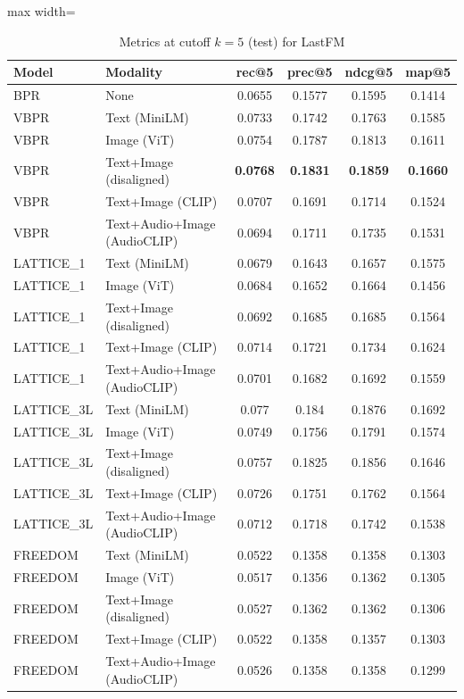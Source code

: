\begin{table}[H]
    \centering
    \begin{adjustbox}{max width=\textwidth}
    \begin{tabular}{|l|l|c|c|c|c|}
    \hline
    	\textbf{Model} & \textbf{Modality} & \textbf{rec@5} & \textbf{prec@5} & \textbf{ndcg@5} & \textbf{map@5} \\
    \hline
    BPR & None & 0.0655 & 0.1577 & 0.1595 & 0.1414 \\
    \hline
    VBPR & Text (MiniLM) & 0.0733 & 0.1742 & 0.1763 & 0.1585 \\
    \hline
    VBPR & Image (ViT) & 0.0754 & 0.1787 & 0.1813 & 0.1611 \\
    \hline
    VBPR & Text+Image (disaligned) & \textbf{0.0768} & \textbf{0.1831} & \textbf{0.1859} & \textbf{0.1660} \\
    \hline
    VBPR & Text+Image (CLIP) & 0.0707 & 0.1691 & 0.1714 & 0.1524 \\
    \hline
    VBPR & Text+Audio+Image (AudioCLIP) & 0.0694 & 0.1711 & 0.1735 & 0.1531 \\
    \hline
    LATTICE\_1 & Text (MiniLM) & 0.0679 & 0.1643 & 0.1657 & 0.1575 \\
    \hline
    LATTICE\_1 & Image (ViT) & 0.0684 & 0.1652 & 0.1664 & 0.1456 \\
    \hline
    LATTICE\_1 & Text+Image (disaligned) & 0.0692 & 0.1685 & 0.1685 & 0.1564 \\
    \hline
    LATTICE\_1 & Text+Image (CLIP) & 0.0714 & 0.1721 & 0.1734 & 0.1624 \\
    \hline
    LATTICE\_1 & Text+Audio+Image (AudioCLIP) & 0.0701 & 0.1682 & 0.1692 & 0.1559 \\
    \hline
    LATTICE\_3L & Text (MiniLM) & 0.077 & 0.184 & 0.1876 & 0.1692 \\
    \hline
    LATTICE\_3L & Image (ViT) & 0.0749 & 0.1756 & 0.1791 & 0.1574 \\
    \hline
    LATTICE\_3L & Text+Image (disaligned) & 0.0757 & 0.1825 & 0.1856 & 0.1646 \\
    \hline
    LATTICE\_3L & Text+Image (CLIP) & 0.0726 & 0.1751 & 0.1762 & 0.1564 \\
    \hline
    LATTICE\_3L & Text+Audio+Image (AudioCLIP) & 0.0712 & 0.1718 & 0.1742 & 0.1538 \\
    \hline
    FREEDOM & Text (MiniLM) & 0.0522 & 0.1358 & 0.1358 & 0.1303 \\
    \hline
    FREEDOM & Image (ViT) & 0.0517 & 0.1356 & 0.1362 & 0.1305 \\
    \hline
    FREEDOM & Text+Image (disaligned) & 0.0527 & 0.1362 & 0.1362 & 0.1306 \\
    \hline
    FREEDOM & Text+Image (CLIP) & 0.0522 & 0.1358 & 0.1357 & 0.1303 \\
    \hline
    FREEDOM & Text+Audio+Image (AudioCLIP) & 0.0526 & 0.1358 & 0.1358 & 0.1299 \\
    \hline
    \end{tabular}
    \end{adjustbox}
    \caption{Metrics at cutoff $k=5$ (test) for LastFM}
    \label{tab:metrics_lastfm_k5}
\end{table}

